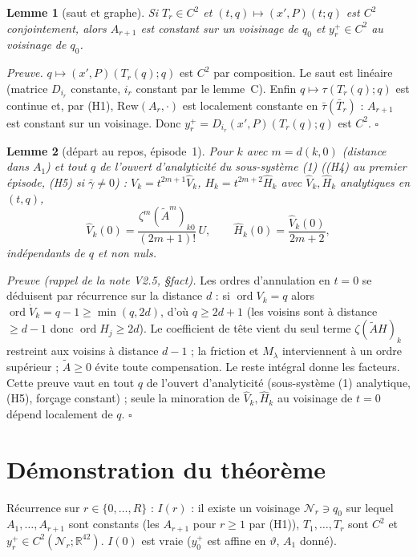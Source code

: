 \documentclass[11pt,a4paper]{article}
\newtheorem{lemme}{Lemme}
\theoremstyle{remark}
\newcommand{\R}{\mathbb R}
\newcommand{\vth}{\vartheta}
\begin{document}
\begin{lemme}[saut et graphe]\label{lem:D}Si $T_r\in C^2$ et $(t,q)\mapsto(x',P)(t;q)$ est $C^2$ conjointement, alors $A_{r+1}$ est constant sur un voisinage de $q_0$ et $y_r^+\in C^2$ au voisinage de $q_0$.\end{lemme}
\emph{Preuve.} $q\mapsto(x',P)(T_r(q);q)$ est $C^2$ par composition. Le saut est lin\'eaire (matrice $D_{i_r}$ constante, $i_r$ constant par le lemme~C). Enfin $q\mapsto\tau(T_r(q);q)$ est continue et, par (H1), $\mathrm{Rew}(A_r,\cdot)$ est localement constante en $\bar\tau(\bar T_r)$ : $A_{r+1}$ est constant sur un voisinage. Donc $y_r^+=D_{i_r}(x',P)(T_r(q);q)$ est $C^2$. $\square$

\begin{lemme}[d\'epart au repos, \'episode~1]\label{lem:fact}Pour $k$ avec $m=d(k,0)$ (distance dans $A_1$) et tout $q$ de l'ouvert d'analyticit\'e du sous-syst\`eme (1) ((H4) au premier \'episode, (H5) si $\bar\gamma\neq0$) : $V_k=t^{2m+1}\hat V_k$, $H_k=t^{2m+2}\hat H_k$ avec $\hat V_k,\hat H_k$ analytiques en $(t,q)$,
\[ \hat V_k(0)=\frac{\zeta^m(\tilde A^m)_{k0}}{(2m+1)!}\,U,\qquad \hat H_k(0)=\frac{\hat V_k(0)}{2m+2}, \]
ind\'ependants de $q$ et non nuls.\end{lemme}
\emph{Preuve (rappel de la note V2.5, \S fact).} Les ordres d'annulation en $t=0$ se d\'eduisent par r\'ecurrence sur la distance $d$ : si $\operatorname{ord}V_k=q$ alors $\operatorname{ord}\dot V_k=q-1\ge\min(q,2d)$, d'o\`u $q\ge2d+1$ (les voisins sont \`a distance $\ge d-1$ donc $\operatorname{ord}H_j\ge2d$). Le coefficient de t\^ete vient du seul terme $\zeta(\tilde AH)_k$ restreint aux voisins \`a distance $d-1$ ; la friction et $M_\lambda$ interviennent \`a un ordre sup\'erieur ; $\tilde A\ge0$ \'evite toute compensation. Le reste int\'egral donne les facteurs. Cette preuve vaut en tout $q$ de l'ouvert d'analyticit\'e (sous-syst\`eme (1) analytique, (H5), for\c{c}age constant) ; seule la minoration de $\hat V_k,\hat H_k$ au voisinage de $t=0$ d\'epend localement de $q$. $\square$

\section{D\'emonstration du th\'eor\`eme}
R\'ecurrence sur $r\in\{0,\dots,R\}$ : \textbf{$I(r)$} : il existe un voisinage $\mathcal N_r\ni q_0$ sur lequel $A_1,\dots,A_{r+1}$ sont constants (les $A_{r+1}$ pour $r\ge1$ par (H1)), $T_1,\dots,T_r$ sont $C^2$ et $y_r^+\in C^2(\mathcal N_r;\R^{42})$. $I(0)$ est vraie ($y_0^+$ est affine en $\vth$, $A_1$ donn\'e).
\end{document}
